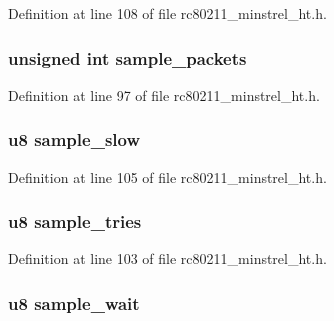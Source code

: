 Definition at line 108 of file rc80211\-\_\-minstrel\-\_\-ht.\-h.

\hypertarget{structminstrel__ht__sta_a7a98923c9bfaab59c35970660fe7ef6f}{
\subsubsection[{sample\-\_\-packets}]{\setlength{\rightskip}{0pt plus 5cm}unsigned int sample\-\_\-packets}}\label{structminstrel__ht__sta_a7a98923c9bfaab59c35970660fe7ef6f}


Definition at line 97 of file rc80211\-\_\-minstrel\-\_\-ht.\-h.

\hypertarget{structminstrel__ht__sta_a64adb5d8e07f2fe59ee79d6062759a4c}{
\subsubsection[{sample\-\_\-slow}]{\setlength{\rightskip}{0pt plus 5cm}u8 sample\-\_\-slow}}\label{structminstrel__ht__sta_a64adb5d8e07f2fe59ee79d6062759a4c}


Definition at line 105 of file rc80211\-\_\-minstrel\-\_\-ht.\-h.

\hypertarget{structminstrel__ht__sta_a0c58b0d161933e7f86d6dada5438ca88}{
\subsubsection[{sample\-\_\-tries}]{\setlength{\rightskip}{0pt plus 5cm}u8 sample\-\_\-tries}}\label{structminstrel__ht__sta_a0c58b0d161933e7f86d6dada5438ca88}


Definition at line 103 of file rc80211\-\_\-minstrel\-\_\-ht.\-h.

\hypertarget{structminstrel__ht__sta_ac908c67104c56185324bcbc21da68959}{
\subsubsection[{sample\-\_\-wait}]{\setlength{\rightskip}{0pt plus 5cm}u8 sample\-\_\-wait}}\label{structminstrel__ht__sta_ac908c67104c56185324bcbc21da68959}


